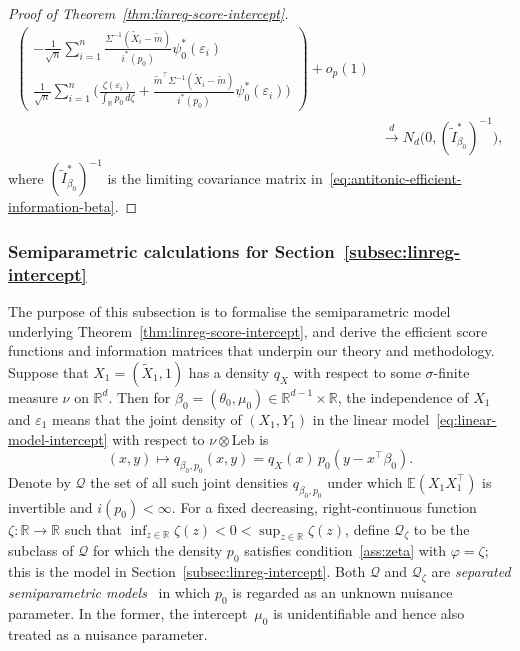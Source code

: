 \documentclass[a4paper]{article}
\newcommand{\R}{\mathbb{R}}
\newcommand{\E}{\mathbb{E}}
\newcommand{\cvd}{\overset{d}{\to}}
\theoremstyle{definition}
\begin{document}
\begin{proof}[Proof of Theorem~\ref{thm:linreg-score-intercept}]
\begin{align*}
\begin{pmatrix}
-\displaystyle\frac{1}{\sqrt{n}}\sum_{i=1}^n \frac{\Sigma^{-1}(\tilde{X}_i - \tilde{m})}{i^*(p_0)}\psi_0^*(\varepsilon_i) \\[8pt]
\displaystyle\frac{1}{\sqrt{n}}\sum_{i=1}^n \biggl(\frac{\zeta(\varepsilon_i)}{\int_\R p_0\,d\zeta} + \frac{\tilde{m}^\top\Sigma^{-1}(\tilde{X}_i - \tilde{m})}{i^*(p_0)}\psi_0^*(\varepsilon_i)\biggr)
\end{pmatrix} + o_p(1) \\[3pt]
&\cvd N_d\bigl(0, (\tilde{I}_{\beta_0}^*)^{-1}\bigr),
\end{align*}
where $(\tilde{I}_{\beta_0}^*)^{-1}$ is the limiting covariance matrix  in~\eqref{eq:antitonic-efficient-information-beta}.
\end{proof}

\subsubsection{Semiparametric calculations for Section~\ref{subsec:linreg-intercept}}
\label{subsec:linreg-semiparametric}

The purpose of this subsection is to formalise the semiparametric model underlying Theorem~\ref{thm:linreg-score-intercept}, and derive the efficient score functions and information matrices that underpin our theory and methodology. Suppose that $X_1 = (\tilde{X}_1,1)$ has a density $q_X$ with respect to some $\sigma$-finite measure $\nu$ on $\R^d$. Then for $\beta_0 = (\theta_0,\mu_0) \in \R^{d-1} \times \R$, the independence of $X_1$ and $\varepsilon_1$ means that the joint density of $(X_1,Y_1)$ in the linear model~\eqref{eq:linear-model-intercept} with respect to $\nu \otimes \mathrm{Leb}$ is
\[
(x,y) \mapsto q_{\beta_0,p_0}(x,y) = q_X(x)\,p_0(y - x^\top\beta_0).
\]
Denote by $\mathcal{Q}$ the set of all such joint densities $q_{\beta_0,p_0}$ under which $\E(X_1 X_1^\top)$ is invertible and $i(p_0) < \infty$. For a fixed decreasing, right-continuous function $\zeta \colon \R \to \R$ such that $\inf_{z \in \R}\zeta(z) < 0 < \sup_{z \in \R}\zeta(z)$, define $\mathcal{Q}_\zeta$ to be the subclass of $\mathcal{Q}$ for which the density $p_0$ satisfies condition~\ref{ass:zeta} with $\varphi = \zeta$; this is the model in Section~\ref{subsec:linreg-intercept}.
Both $\mathcal{Q}$ and $\mathcal{Q}_\zeta$ are \textit{separated semiparametric models}~\citep[Section~25.4]{vdV1998asymptotic} in which $p_0$ is regarded as an unknown nuisance parameter. In the former, the intercept~$\mu_0$ is unidentifiable and hence also treated as a nuisance parameter.
\end{document}

